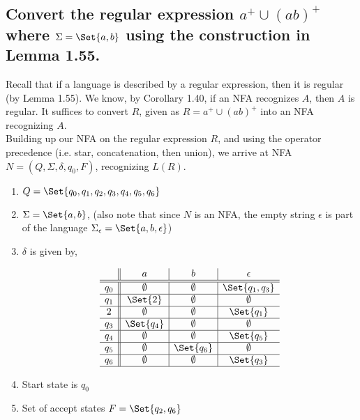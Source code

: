 \documentclass{article}
\begin{document}
\subsection{Convert the regular expression $a^+ \cup (ab)^+$ where $\Sigma = \Set{a,b}$ using the construction in Lemma 1.55.}

Recall that if a language is described by a regular expression, then it is regular (by Lemma 1.55).  We know, by Corollary 1.40, if an NFA recognizes $A$, then $A$ is regular.  It suffices to convert $R$, given as $R = a^+ \cup (ab)^+$ into an NFA recognizing $A$. \\

Building up our NFA on the regular expression $R$, and using the operator precedence (i.e. star, concatenation, then union), we arrive at NFA $N = (Q, \Sigma, \delta, q_0, F)$, recognizing $L(R)$. \\

\begin{enumerate}
    \item $Q = \Set{q_0,q_1,q_2,q_3,q_4,q_5,q_6}$
    \item $\Sigma = \Set{a,b}$, (also note that since $N$ is an NFA, the empty string $\epsilon$ is part of the language $\Sigma_{\epsilon} = \Set{a,b,\epsilon}$)
    \item $\delta$ is given by,
    
\begin{figure}[H]
\centering

\[
\begin{array}{c||c|c|c}
         & a & b & \epsilon \\ \hline \hline 
        q_0 & \emptyset & \emptyset & \Set{q_1,q_3} \\ \hline 
        q_1 & \Set{2} & \emptyset & \emptyset \\ \hline 
        2 & \emptyset & \emptyset & \Set{q_1} \\ \hline 
        q_3 & \Set{q_4} & \emptyset & \emptyset \\ \hline 
        q_4 & \emptyset & \emptyset & \Set{q_5} \\ \hline 
        q_5 & \emptyset & \Set{q_6} & \emptyset \\ \hline 
        q_6 & \emptyset & \emptyset & \Set{q_3} \\ \hline 
\end{array}
\]

\caption{}
\label{fig:3}
\end{figure}

    
    \item Start state is $q_0$
    \item Set of accept states $F = \Set{q_2,q_6}$
\end{enumerate}
\end{document}
